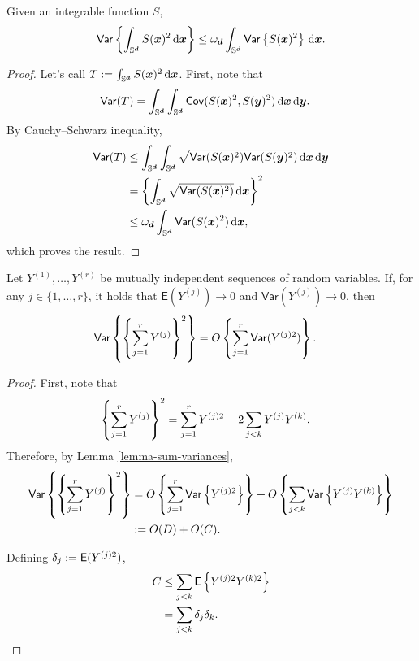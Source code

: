 \documentclass[oneside,11pt]{article}
\begin{document}
\begin{lemma}
    Given an integrable function $S$,
    \begin{align*}
        \mathsf{Var} \left\{\int_{\mathbb{S}^{\boldsymbol{d}}} S(\boldsymbol{x})^2 \,\mathrm{d} \boldsymbol{x}\right\} \le \omega_{\boldsymbol{d}} \int_{\mathbb{S}^{\boldsymbol{d}}} \mathsf{Var} \left\{S(\boldsymbol{x})^2\right\} \,\mathrm{d} \boldsymbol{x}.
    \end{align*}
\end{lemma}
\begin{proof}
    Let's call $T := \int_{\mathbb{S}^{\boldsymbol{d}}} S(\boldsymbol{x})^2 \,\mathrm{d} \boldsymbol{x}$. First, note that
    \begin{align*}
        \mathsf{Var} (T) &= \int_{\mathbb{S}^{\boldsymbol{d}}} \int_{\mathbb{S}^{\boldsymbol{d}}} \mathsf{Cov} (S(\boldsymbol{x})^2, S(\boldsymbol{y})^2) \,\mathrm{d} \boldsymbol{x} \,\mathrm{d} \boldsymbol{y}.
    \end{align*}
    By Cauchy–Schwarz inequality,
    \begin{align*}
        \mathsf{Var} (T) &\le \int_{\mathbb{S}^{\boldsymbol{d}}} \int_{\mathbb{S}^{\boldsymbol{d}}} \sqrt{\mathsf{Var}(S(\boldsymbol{x})^2) \mathsf{Var}(S(\boldsymbol{y})^2) } \,\mathrm{d} \boldsymbol{x} \,\mathrm{d} \boldsymbol{y} \\
        &= \left\{\int_{\mathbb{S}^{\boldsymbol{d}}} \sqrt{\mathsf{Var}(S(\boldsymbol{x})^2) } \,\mathrm{d} \boldsymbol{x}\right\}^2 \\
        &\le \omega_{\boldsymbol{d}} \int_{\mathbb{S}^{\boldsymbol{d}}} \mathsf{Var}(S(\boldsymbol{x})^2) \,\mathrm{d} \boldsymbol{x},
    \end{align*}
    which proves the result.
\end{proof}

\begin{lemma}
    Let $Y^{(1)}, \dots, Y^{(r)}$ be mutually independent sequences of random variables. If, for any $j \in \{ 1, \dots, r\}$, it holds that $\mathsf{E} (Y^{(j)}) \to 0$ and $\mathsf{Var} (Y^{(j)}) \to 0$, then
    \begin{align*}
        \mathsf{Var} \left\{\left\{\sum_{j=1}^{r} Y^{(j)}\right\}^2\right\} &= O \left\{\sum_{j=1}^{r} \mathsf{Var} (Y^{(j)2})\right\}.
    \end{align*}
\end{lemma}
\begin{proof}
    First, note that
    \begin{align*}
        \left\{\sum_{j=1}^{r} Y^{(j)}\right\}^2 &= \sum_{j=1}^{r} Y^{(j)2} + 2 \sum_{j<k} Y^{(j)} Y^{(k)}.
    \end{align*}
    Therefore, by Lemma \ref{lemma-sum-variances},
    \begin{align*}
        \mathsf{Var} \left\{\left\{\sum_{j=1}^{r} Y^{(j)}\right\}^2\right\} &= O \left\{\sum_{j=1}^{r} \mathsf{Var} \left\{ Y^{(j)2}\right\}\right\} + O \left\{\sum_{j<k} \mathsf{Var} \left\{ Y^{(j)} Y^{(k)}\right\}\right\} \\
        &:= O(D)+O(C).
    \end{align*}

    Defining $\delta_j := \mathsf{E} (Y^{(j)2})$,
    \begin{align*}
        C &\le \sum_{j<k} \mathsf{E} \left\{ Y^{(j)2} Y^{(k)2}\right\} \\
        &= \sum_{j<k} \delta_j \delta_k.
    \end{align*}
\end{proof}
\end{document}
